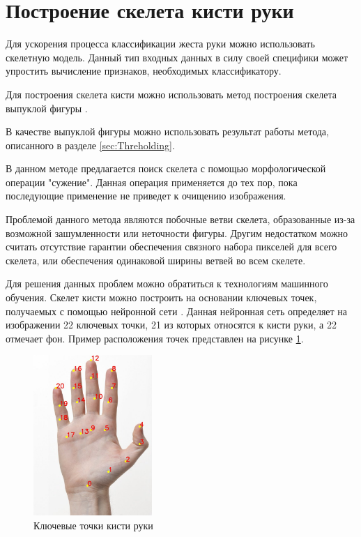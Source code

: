 \section{Построение скелета кисти руки}
\label{sec:Skeleton}

Для ускорения процесса классификации жеста руки можно использовать скелетную модель. Данный тип входных данных в силу своей специфики может упростить вычисление признаков, необходимых классификатору.

Для построения скелета кисти можно использовать метод построения скелета выпуклой фигуры \cite{DIP}. 

В качестве выпуклой фигуры можно использовать результат работы метода, описанного в разделе \ref{sec:Threholding}.

В данном методе предлагается поиск скелета с помощью морфологической операции "сужение". Данная операция применяется до тех пор, пока последующие применение не приведет к очищению изображения. 

Проблемой данного метода являются побочные ветви скелета, образованные из-за возможной зашумленности или неточности фигуры. Другим недостатком можно считать отсутствие гарантии обеспечения связного набора пикселей для всего скелета, или обеспечения одинаковой ширины ветвей во всем скелете.

Для решения данных проблем можно обратиться к технологиям машинного обучения. Скелет кисти можно построить на основании ключевых точек, получаемых с помощью нейронной сети \cite{DNN}. Данная нейронная сеть определяет на изображении 22 ключевых точки, 21 из которых относятся к кисти руки, а 22 отмечает фон. Пример расположения точек представлен на рисунке \ref{fig:keypoints}.

\begin{figure}[!h]
	\centering
	\includegraphics[width=0.4\textwidth,keepaspectratio]{figures/ru/handpose-demo-keypoints.jpg}
	\caption{Ключевые точки кисти руки}
	\label{fig:keypoints}
\end{figure}

